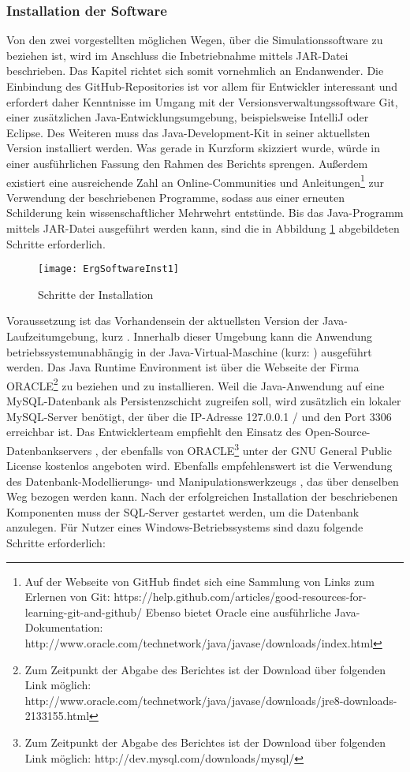 \subsubsection{Installation der Software}
Von den zwei vorgestellten möglichen Wegen, über die Simulationssoftware zu beziehen ist, wird im Anschluss die Inbetriebnahme mittels JAR-Datei beschrieben. Das Kapitel richtet sich somit vornehmlich an Endanwender.
Die Einbindung des GitHub-Repositories ist vor allem für Entwickler interessant und erfordert daher Kenntnisse im Umgang mit der Versionsverwaltungssoftware Git, einer zusätzlichen Java-Entwicklungsumgebung, beispielsweise IntelliJ oder Eclipse. Des Weiteren muss das Java-Development-Kit in seiner aktuellsten Version installiert werden. Was gerade in Kurzform skizziert wurde, würde in einer ausführlichen Fassung den Rahmen des Berichts sprengen. Außerdem existiert eine ausreichende Zahl an Online-Communities und Anleitungen\footnote{Auf der Webseite von GitHub findet sich eine Sammlung von Links zum Erlernen von Git: https://help.github.com/articles/good-resources-for-learning-git-and-github/
Ebenso bietet Oracle eine ausführliche Java-Dokumentation: http://www.oracle.com/technetwork/java/javase/downloads/index.html} zur Verwendung der beschriebenen Programme, sodass aus einer erneuten Schilderung kein wissenschaftlicher Mehrwehrt entstünde.
Bis das Java-Programm mittels JAR-Datei ausgeführt werden kann, sind die in Abbildung \ref{fig:ErgSoftwareInst1} abgebildeten Schritte erforderlich.
\begin{figure}[ht]
	\centering
	\texttt{[image: ErgSoftwareInst1]}
	\caption{Schritte der Installation}
	\label{fig:ErgSoftwareInst1}
\end{figure}
Voraussetzung ist das Vorhandensein der aktuellsten Version der Java-Laufzeitumgebung, kurz . Innerhalb dieser Umgebung kann die Anwendung betriebssystemunabhängig in der Java-Virtual-Maschine (kurz: ) ausgeführt werden. Das Java Runtime Environment ist über die Webseite der Firma ORACLE\footnote{Zum Zeitpunkt der Abgabe des Berichtes ist der Download über folgenden Link möglich: http://www.oracle.com/technetwork/java/javase/downloads/jre8-downloads-2133155.html} zu beziehen und zu installieren.
Weil die Java-Anwendung auf eine MySQL-Datenbank als Persistenzschicht zugreifen soll, wird zusätzlich ein lokaler MySQL-Server benötigt, der über die IP-Adresse 127.0.0.1 /  und den Port 3306 erreichbar ist. Das Entwicklerteam empfiehlt den Einsatz des Open-Source-Datenbankservers , der ebenfalls von ORACLE\footnote{Zum Zeitpunkt der Abgabe des Berichtes ist der Download über folgenden Link möglich: http://dev.mysql.com/downloads/mysql/} unter der GNU General Public License kostenlos angeboten wird. Ebenfalls empfehlenswert ist die Verwendung des Datenbank-Modellierungs- und Manipulationswerkzeugs , das über denselben Weg bezogen werden kann.
Nach der erfolgreichen Installation der beschriebenen Komponenten muss der SQL-Server gestartet werden, um die Datenbank anzulegen. Für Nutzer eines Windows-Betriebssystems sind dazu folgende Schritte erforderlich:

